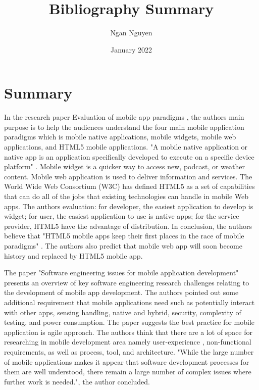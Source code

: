 \documentclass{article}
\title{Bibliography Summary}
\author{Ngan Nguyen}
\date{January 2022}
\begin{document}
\maketitle

\section*{Summary}
In the research paper Evaluation of mobile app paradigms \cite{10.1145/2428955.2428968}, the authors main purpose is to help the audiences understand the four main mobile application paradigms which is mobile native applications, mobile widgets, mobile web applications, and HTML5 mobile applications. "A mobile native application or native app is an application
specifically developed to execute on a specific device platform" \cite{10.1145/2428955.2428968}. Mobile widget is a quicker way to access new, podcast, or weather content. Mobile web application is used to deliver information and services. The World Wide Web Consortium (W3C) has defined HTML5 as a set of capabilities that can do all of the jobs that existing technologies can handle in mobile Web apps. The authors evaluation: for developer, the easiest application to develop is widget; for user, the easiest application to use is native apps; for the service provider, HTML5 have the advantage of distribution. In conclusion, the authors believe that "HTML5 mobile apps keep their first places in the race of mobile paradigms" \cite{10.1145/2428955.2428968}. The authors also predict that mobile web app will soon become history and replaced by HTML5 mobile app. 

\medskip

The paper "Software engineering issues for mobile application development" \cite{10.1145/1882362.1882443} presents an overview of key software engineering research challenges relating to the development of mobile app development. The authors pointed out some additional requirement that mobile applications need such as potentially interact with other apps, sensing handling, native and hybrid, security, complexity of testing, and power consumption. The paper suggests the best practice for mobile application is agile approach. The authors think that there are a lot of space for researching in mobile development area namely user-experience , non-functional requirements, as well as process, tool, and architecture. "While the large number of mobile applications makes it appear
that software development processes for them are well understood, there remain a large number of complex issues where further work is needed."\cite{10.1145/1882362.1882443}, the author concluded.
\end{document}
